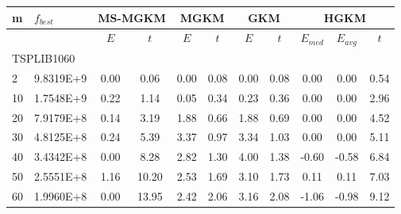 {\footnotesize
\centering
\begin{longtable}{@{}llccccccccc@{}}
\hline
\multicolumn{1}{l|}{m}   & \multicolumn{1}{l|}{$f_{best}$} & \multicolumn{2}{c|}{MS-MGKM}        & \multicolumn{2}{c|}{MGKM}           & \multicolumn{2}{c|}{GKM}            & \multicolumn{3}{c}{HGKM}        \\ \hline
                         & \multicolumn{1}{l|}{}           & $E$  & \multicolumn{1}{c|}{$t$}     & $E$  & \multicolumn{1}{c|}{$t$}     & $E$  & \multicolumn{1}{c|}{$t$}     & $E_{med}$ & $E_{avg}$ & $t$     \\ \hline
\multicolumn{11}{l}{TSPLIB1060}                                                                                                                                                                                \\ \hline
\multicolumn{1}{l|}{2}   & \multicolumn{1}{l|}{9.8319E+9}  & 0.00 & \multicolumn{1}{c|}{0.06}    & 0.00 & \multicolumn{1}{c|}{0.08}    & 0.00 & \multicolumn{1}{c|}{0.08}    & 0.00      & 0.00      & 0.54    \\
\multicolumn{1}{l|}{10}  & \multicolumn{1}{l|}{1.7548E+9}  & 0.22 & \multicolumn{1}{c|}{1.14}    & 0.05 & \multicolumn{1}{c|}{0.34}    & 0.23 & \multicolumn{1}{c|}{0.36}    & 0.00      & 0.00      & 2.96    \\
\multicolumn{1}{l|}{20}  & \multicolumn{1}{l|}{7.9179E+8}  & 0.14 & \multicolumn{1}{c|}{3.19}    & 1.88 & \multicolumn{1}{c|}{0.66}    & 1.88 & \multicolumn{1}{c|}{0.69}    & 0.00      & 0.00      & 4.52    \\
\multicolumn{1}{l|}{30}  & \multicolumn{1}{l|}{4.8125E+8}  & 0.24 & \multicolumn{1}{c|}{5.39}    & 3.37 & \multicolumn{1}{c|}{0.97}    & 3.34 & \multicolumn{1}{c|}{1.03}    & 0.00      & 0.00      & 5.11    \\
\multicolumn{1}{l|}{40}  & \multicolumn{1}{l|}{3.4342E+8}  & 0.00 & \multicolumn{1}{c|}{8.28}    & 2.82 & \multicolumn{1}{c|}{1.30}    & 4.00 & \multicolumn{1}{c|}{1.38}    & -0.60     & -0.58     & 6.84    \\
\multicolumn{1}{l|}{50}  & \multicolumn{1}{l|}{2.5551E+8}  & 1.16 & \multicolumn{1}{c|}{10.20}   & 2.53 & \multicolumn{1}{c|}{1.69}    & 3.10 & \multicolumn{1}{c|}{1.73}    & 0.11      & 0.11      & 7.03    \\
\multicolumn{1}{l|}{60}  & \multicolumn{1}{l|}{1.9960E+8}  & 0.00 & \multicolumn{1}{c|}{13.95}   & 2.42 & \multicolumn{1}{c|}{2.06}    & 3.16 & \multicolumn{1}{c|}{2.08}    & -1.06     & -0.98     & 9.12    \\

\end{longtable}}
